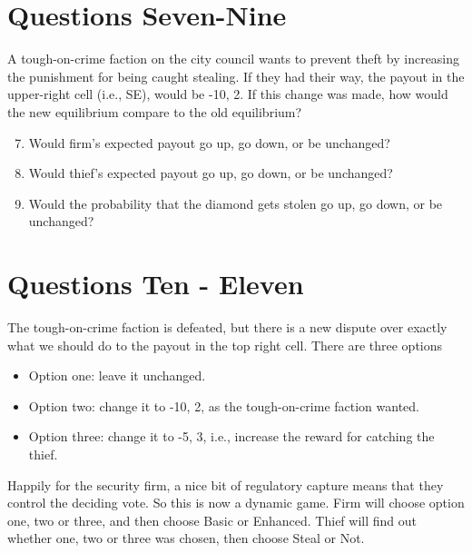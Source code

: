 \section{Questions Seven-Nine}
\label{questionsseven-nine}

A tough-on-crime faction on the city council wants to prevent theft by increasing the punishment for being caught stealing. If they had their way, the payout in the upper-right cell (i.e., SE), would be -10, 2. If this change was made, how would the new equilibrium compare to the old equilibrium?

\begin{enumerate}
\setcounter{enumi}{6}
\item{} Would firm's expected payout go up, go down, or be unchanged?

\item{} Would thief's expected payout go up, go down, or be unchanged?

\item{} Would the probability that the diamond gets stolen go up, go down, or be unchanged?

\end{enumerate}

\newpage
\section{Questions Ten - Eleven}
\label{questionsten-}

The tough-on-crime faction is defeated, but there is a new dispute over exactly what we should do to the payout in the top right cell. There are three options

\begin{itemize}
\item{} Option one: leave it unchanged.

\item{} Option two: change it to -10, 2, as the tough-on-crime faction wanted.

\item{} Option three: change it to -5, 3, i.e., increase the reward for catching the thief.

\end{itemize}

Happily for the security firm, a nice bit of regulatory capture means that they control the deciding vote. So this is now a dynamic game. Firm will choose option one, two or three, and then choose Basic or Enhanced. Thief will find out whether one, two or three was chosen, then choose Steal or Not.

